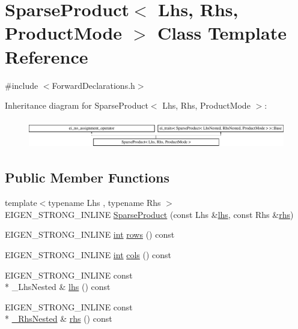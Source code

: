 \hypertarget{class_sparse_product}{\section{Sparse\-Product$<$ Lhs, Rhs, Product\-Mode $>$ Class Template Reference}
\label{class_sparse_product}
}


{\ttfamily \#include $<$Forward\-Declarations.\-h$>$}

Inheritance diagram for Sparse\-Product$<$ Lhs, Rhs, Product\-Mode $>$\-:\begin{figure}[H]
\begin{center}
\leavevmode
\includegraphics[height=1.264108cm]{class_sparse_product}
\end{center}
\end{figure}
\subsection*{Public Member Functions}
\begin{DoxyCompactItemize}
\item 
{\footnotesize template$<$typename Lhs , typename Rhs $>$ }\\E\-I\-G\-E\-N\-\_\-\-S\-T\-R\-O\-N\-G\-\_\-\-I\-N\-L\-I\-N\-E \hyperlink{class_sparse_product_a1d4b6c1d0ada46eef5d7c902dd98beac}{Sparse\-Product} (const Lhs \&\hyperlink{class_sparse_product_a2f87ce367b8ae78d85287ac341081893}{lhs}, const Rhs \&\hyperlink{class_sparse_product_ac6fd24d36f19393aa4292c3eb03b5acd}{rhs})
\item 
E\-I\-G\-E\-N\-\_\-\-S\-T\-R\-O\-N\-G\-\_\-\-I\-N\-L\-I\-N\-E \hyperlink{ioapi_8h_a787fa3cf048117ba7123753c1e74fcd6}{int} \hyperlink{class_sparse_product_a86d9218a23c8b86e5c6d5cfec556146a}{rows} () const 
\item 
E\-I\-G\-E\-N\-\_\-\-S\-T\-R\-O\-N\-G\-\_\-\-I\-N\-L\-I\-N\-E \hyperlink{ioapi_8h_a787fa3cf048117ba7123753c1e74fcd6}{int} \hyperlink{class_sparse_product_a409157aea7d73761a8420a0f9e5a6f08}{cols} () const 
\item 
E\-I\-G\-E\-N\-\_\-\-S\-T\-R\-O\-N\-G\-\_\-\-I\-N\-L\-I\-N\-E const \\*
\-\_\-\-Lhs\-Nested \& \hyperlink{class_sparse_product_a2f87ce367b8ae78d85287ac341081893}{lhs} () const 
\item 
E\-I\-G\-E\-N\-\_\-\-S\-T\-R\-O\-N\-G\-\_\-\-I\-N\-L\-I\-N\-E const \\*
\hyperlink{class_sparse_product_a7141181a40741a5edf265e18053b5d92}{\-\_\-\-Rhs\-Nested} \& \hyperlink{class_sparse_product_ac6fd24d36f19393aa4292c3eb03b5acd}{rhs} () const 
\end{DoxyCompactItemize}
